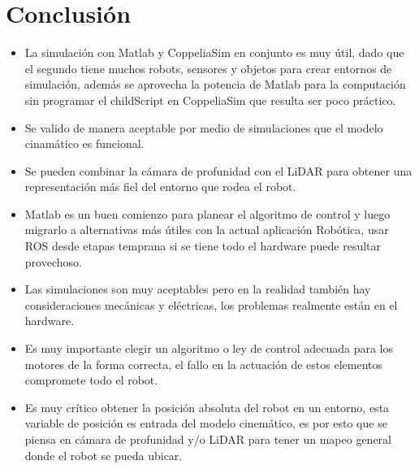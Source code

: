 \documentclass[conference]{IEEEtran}
\begin{document}
\section{Conclusión}
\begin{itemize}
  \item La simulación con Matlab y CoppeliaSim en conjunto es muy útil, dado que el 
  segundo tiene muchos robots, sensores y objetos para crear entornos de simulación, 
  además se aprovecha la potencia de Matlab para la computación sin programar el 
  childScript en CoppeliaSim que resulta ser poco práctico.
  \item Se valido de manera aceptable por medio de simulaciones que el modelo cinamático 
  es funcional.
  \item Se pueden combinar la cámara de profunidad con el LiDAR para obtener una representación
  más fiel del entorno que rodea el robot.
  \item Matlab es un buen comienzo para planear el algoritmo de control y luego migrarlo
  a alternativas más útiles con la actual aplicación Robótica, usar ROS desde etapas
  temprana si se tiene todo el hardware puede resultar provechoso.
  \item Las simulaciones son muy aceptables pero en la realidad también hay consideraciones
  mecánicas y eléctricas, los problemas realmente están en el hardware.
  \item Es muy importante elegir un algoritmo o ley de control adecuada para los motores de 
  la forma correcta, el fallo en la actuación de estos elementos compromete todo el robot.
  \item Es muy crítico obtener la posición absoluta del robot en un entorno,
  esta variable de posición es entrada del modelo cinemático, es por esto que se piensa en
  cámara de profunidad y/o LiDAR para tener un mapeo general donde el robot se pueda ubicar.
\end{itemize}
\newpage



\end{document}
